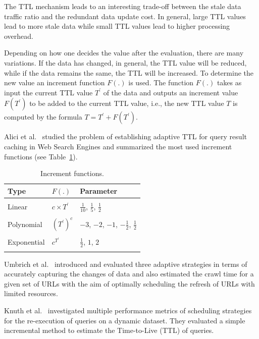 \documentclass[sw]{iosart2x}
\begin{document}
The TTL mechanism leads to an interesting trade-off between the stale data traffic ratio and the redundant data update cost. In general, large TTL values lead to more stale data while small TTL values lead to higher processing overhead.

Depending on how one decides the value after the evaluation, there are many variations. If the data has changed, in general, the TTL value will be reduced, while if the data remains the same, the TTL will be increased. To determine the new value an increment function $F(.)$ is used. The function $F(.)$ takes as input the current TTL value $T^\prime$ of the data and outputs an increment value $F(T^\prime)$ to be added to the current TTL value, i.e., the new TTL value $ T $ is computed by the formula $T=T^\prime+F(T^\prime)$.

Alici et al.~\cite{AliciAOCU12} studied the problem of establishing adaptive TTL for query result caching in Web Search Engines and summarized the most used increment functions (see Table~\ref{tab:funtion}).

\begin{table}[h]
	\centering
	\caption{Increment functions.}
	\label{tab:funtion}
	\begin{tabular}{lll} \hline 
		Type        & $F(.)$ & Parameter \\    \hline \\
		Linear      & $c \times T^\prime$      & $\frac{1}{10}$, $\frac{1}{5}$, $\frac{1}{2}$     \\ \\
		Polynomial  & $(T^\prime)^c$      & $ -3 $, $ -2 $, $ -1 $, $-\frac{1}{2}$, $\frac{1}{2}$   \\	\\
		Exponential & $c^{T^\prime}$      & $\frac{1}{2}$, $ 1 $, $ 2 $    \\  \\  \hline     
	\end{tabular}    
\end{table}

Umbrich et al.~\cite{UmbrichMP15} introduced and evaluated three adaptive strategies in terms of accurately capturing the changes of data and also estimated the crawl time for a given set of URLs with the aim of optimally scheduling the refresh of URLs with limited resources.

Knuth et al.~\cite{KnuthHS16} investigated multiple performance metrics of scheduling strategies for the re-execution of queries on a dynamic dataset. They evaluated a simple incremental method to estimate the Time-to-Live (TTL) of queries.\\
\end{document}

